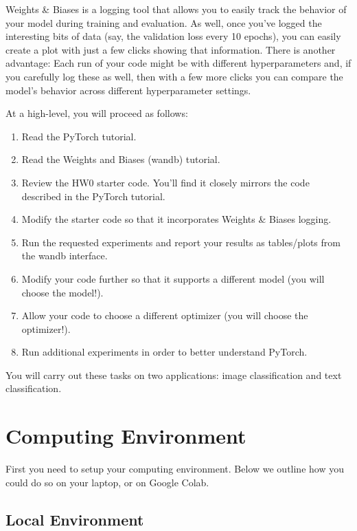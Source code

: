 \documentclass[11pt,addpoints,answers]{exam}
\begin{document}
Weights \& Biases is a logging tool that allows you to easily track the behavior of your model during training and evaluation. As well, once you've logged the interesting bits of data (say, the validation loss every 10 epochs), you can easily create a plot with just a few clicks showing that information. There is another advantage: Each run of your code might be with different hyperparameters and, if you carefully log these as well, then with a few more clicks you can compare the model's behavior across different hyperparameter settings.

At a high-level, you will proceed as follows:

\begin{enumerate}
\item Read the PyTorch tutorial.
\item Read the Weights and Biases (wandb) tutorial.
\item Review the HW0 starter code. You'll find it closely mirrors the code described in the PyTorch tutorial.
\item Modify the starter code so that it incorporates Weights \& Biases logging.
\item Run the requested experiments and report your results as tables/plots from the wandb interface.
\item Modify your code further so that it supports a different model (you will choose the model!).
\item Allow your code to choose a different optimizer (you will choose the optimizer!).
\item Run additional experiments in order to better understand PyTorch.
\end{enumerate}

You will carry out these tasks on two applications: image classification and text classification.

\clearpage

\section*{Computing Environment}
\label{sec:env}

First you need to setup your computing environment. Below we outline how you could do so on your laptop, or on Google Colab.

\subsection*{Local Environment}
\label{sec:local}
\end{document}
